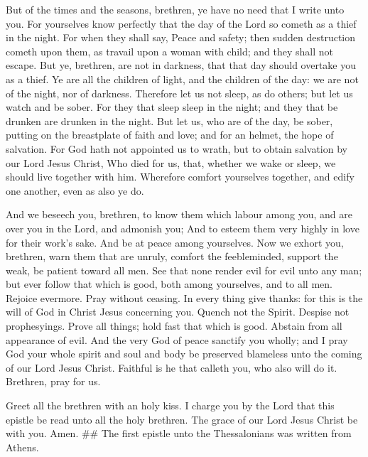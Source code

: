  But of the times and the seasons, brethren, ye have no need
that I write unto you.  For yourselves know perfectly that
the day of the Lord so cometh as a thief in the night.  For
when they shall say, Peace and safety; then sudden destruction cometh
upon them, as travail upon a woman with child; and they shall not
escape.  But ye, brethren, are not in darkness, that that
day should overtake you as a thief.  Ye are all the children
of light, and the children of the day: we are not of the night, nor of
darkness.  Therefore let us not sleep, as do others; but let
us watch and be sober.  For they that sleep sleep in the
night; and they that be drunken are drunken in the night. 
But let us, who are of the day, be sober, putting on the breastplate of
faith and love; and for an helmet, the hope of salvation. 
For God hath not appointed us to wrath, but to obtain salvation by our
Lord Jesus Christ,  Who died for us, that, whether we wake
or sleep, we should live together with him.  Wherefore
comfort yourselves together, and edify one another, even as also ye do.

 And we beseech you, brethren, to know them which labour
among you, and are over you in the Lord, and admonish you; 
And to esteem them very highly in love for their work's sake. And be at
peace among yourselves.  Now we exhort you, brethren, warn
them that are unruly, comfort the feebleminded, support the weak, be
patient toward all men.  See that none render evil for evil
unto any man; but ever follow that which is good, both among yourselves,
and to all men.  Rejoice evermore.  Pray
without ceasing.  In every thing give thanks: for this is
the will of God in Christ Jesus concerning you.  Quench not
the Spirit.  Despise not prophesyings.  Prove
all things; hold fast that which is good.  Abstain from all
appearance of evil.  And the very God of peace sanctify you
wholly; and I pray God your whole spirit and soul and body be preserved
blameless unto the coming of our Lord Jesus Christ. 
Faithful is he that calleth you, who also will do it. 
Brethren, pray for us.

 Greet all the brethren with an holy kiss.  I
charge you by the Lord that this epistle be read unto all the holy
brethren.  The grace of our Lord Jesus Christ be with you.
Amen. \#\# The first epistle unto the Thessalonians was written from
Athens.
